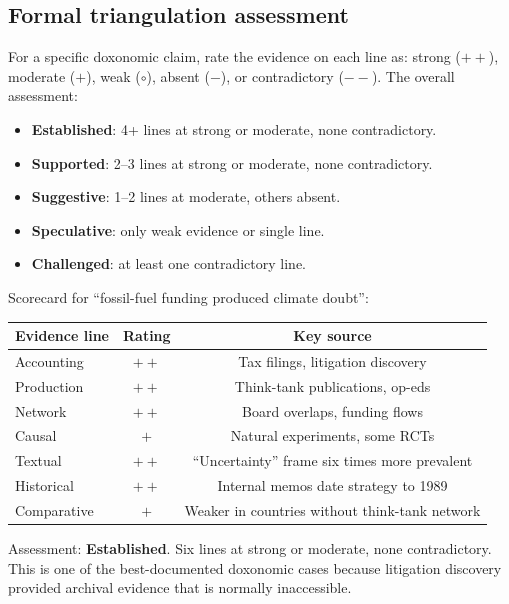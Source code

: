 \subsection{Formal triangulation assessment}

\begin{model}
\label{mod:triangulation-score}
For a specific doxonomic claim, rate the evidence on each line as: strong ($++$), moderate ($+$), weak ($\circ$), absent ($-$), or contradictory ($--$).
The overall assessment:
\begin{itemize}[nosep]
  \item \textbf{Established}: 4+ lines at strong or moderate, none contradictory.
  \item \textbf{Supported}: 2--3 lines at strong or moderate, none contradictory.
  \item \textbf{Suggestive}: 1--2 lines at moderate, others absent.
  \item \textbf{Speculative}: only weak evidence or single line.
  \item \textbf{Challenged}: at least one contradictory line.
\end{itemize}
\end{model}

\begin{example}
\label{ex:triangulation}
Scorecard for ``fossil-fuel funding produced climate doubt'':

\begin{center}
\begin{tabular}{lcc}
\toprule
Evidence line & Rating & Key source \\
\midrule
Accounting & $++$ & Tax filings, litigation discovery \\
Production & $++$ & Think-tank publications, op-eds \\
Network & $++$ & Board overlaps, funding flows \\
Causal & $+$ & Natural experiments, some RCTs \\
Textual & $++$ & ``Uncertainty'' frame six times more prevalent \\
Historical & $++$ & Internal memos date strategy to 1989 \\
Comparative & $+$ & Weaker in countries without think-tank network \\
\bottomrule
\end{tabular}
\end{center}
Assessment: \textbf{Established}.
Six lines at strong or moderate, none contradictory.
This is one of the best-documented doxonomic cases because litigation discovery provided archival evidence that is normally inaccessible.
\end{example}

